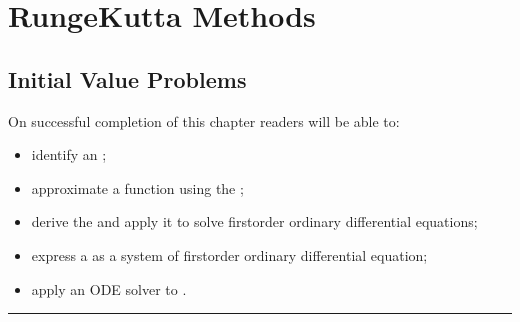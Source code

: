 \documentclass[letterpaper,10pt,english]{jupyterBook}
\begin{document}
\sphinxstepscope


\part{Runge\sphinxhyphen{}Kutta Methods}

\sphinxstepscope


\chapter{Initial Value Problems}
\label{\detokenize{1_IVPs/1.0_IVPs:initial-value-problems}}\label{\detokenize{1_IVPs/1.0_IVPs:ivp-chapter}}\label{\detokenize{1_IVPs/1.0_IVPs::doc}}
\sphinxAtStartPar
{}

\sphinxAtStartPar
On successful completion of this chapter readers will be able to:
\begin{itemize}
\item {} 
\sphinxAtStartPar
identify an {\hyperref[\detokenize{1_IVPs/1.0_IVPs:ivp-definition}]{}};

\item {} 
\sphinxAtStartPar
approximate a function using the {\hyperref[\detokenize{1_IVPs/1.1_Taylor_Series:taylor-series-definition}]{}};

\item {} 
\sphinxAtStartPar
derive the {\hyperref[\detokenize{1_IVPs/1.2_Euler_Method:euler-method-definition}]{}} and apply it to solve first\sphinxhyphen{}order ordinary differential equations;

\item {} 
\sphinxAtStartPar
express a {\hyperref[\detokenize{1_IVPs/1.5_Higher_Order_ODEs:higher-order-odes-section}]{}} as a system of first\sphinxhyphen{}order ordinary differential equation;

\item {} 
\sphinxAtStartPar
apply an ODE solver to {\hyperref[\detokenize{1_IVPs/1.5_Higher_Order_ODEs:solving-systems-of-odes-section}]{}}.

\end{itemize}


\bigskip\hrule\bigskip
\end{document}
